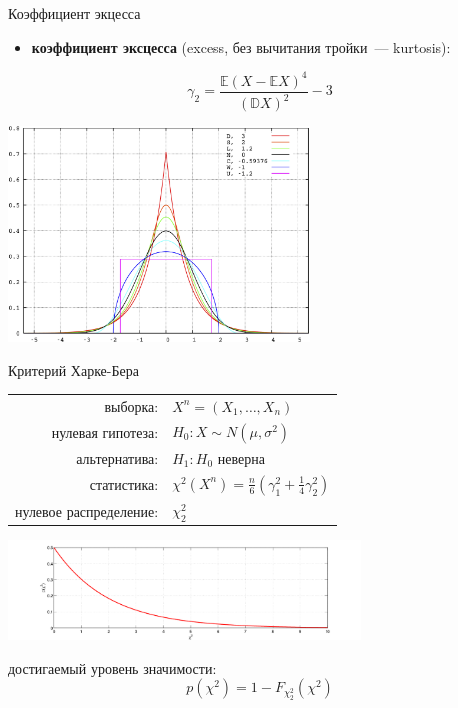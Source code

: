 \documentclass[9pt,pdf,utf8,hyperref={unicode},aspectratio=169]{beamer}
\begin{document}
\begin{frame}{Коэффициент экцесса}
\begin{itemize}
			\item \textbf{коэффициент эксцесса} (excess, без вычитания тройки~--- kurtosis):
		\end{itemize}
	$$\gamma_2 =  \frac{\mathbb{E}\left(X-\mathbb{E}X\right)^4}{\left(\mathbb{D}X\right)^2} - 3$$
	\begin{center}
		\includegraphics[width=0.6\textwidth]{kurtosis.png}
	\end{center}
	
\end{frame}
\begin{frame}{Критерий Харке-Бера}
	\begin{center}
		\begin{tabular}{rl}
			выборка:                        & $X^n=\left(X_1,\ldots,X_n\right)$         \\
			нулевая гипотеза:               & $H_0\colon X \sim N\left(\mu,\sigma^2\right)$ \\
			альтернатива:                   & $H_1\colon H_0$ неверна \\
			статистика:                     & $\chi^2\left(X^n\right) = \frac{n}{6}\left(\gamma_1^2 + \frac1{4} \gamma_2^2\right)$ \\
			нулевое распределение:          & $\chi^2_2$\\
		\end{tabular}
		\includegraphics[width=0.7\textwidth]{chi22.png}
	\end{center}
	достигаемый уровень значимости:
	$$p\left(\chi^2\right) = 1 - F_{\chi^2_2}\left(\chi^2\right)$$
\end{frame}
\end{document}
